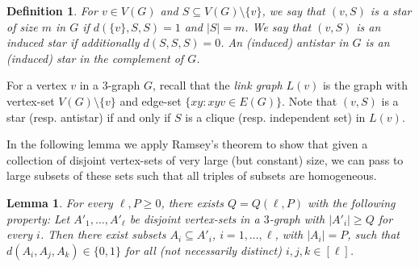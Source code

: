 \documentclass[11pt]{article}
\let\oldendproof\endproof
\renewenvironment{proof}[1][\proofname]{%
	\oldproof[\bf #1]%
}{\oldendproof}
\theoremstyle{plain}
\newtheorem{lemma}[theorem]{Lemma}
\newtheorem{claim}[theorem]{Claim}
\newtheorem{definition}[theorem]{Definition}
\begin{document}
\begin{definition}
    For $v \in V(G)$ and $S \subseteq V(G) \setminus \{v\}$, we say that $(v,S)$ is a {\em star} of size $m$ in $G$ if $d(\{v\},S,S)=1$ and $|S| = m$. We say that $(v,S)$ is an {\em induced star} if additionally $d(S,S,S)=0$. An (induced) {\em antistar} in $G$ is an (induced) star in the complement of $G$.
\end{definition}

For a vertex $v$ in a $3$-graph $G$, recall that the {\em link graph} $L(v)$ is the graph with vertex-set $V(G)\setminus\{v\}$ and edge-set $\{xy : xyv \in E(G)\}$.
Note that $(v,S)$ is a star (resp. antistar) if and only if $S$ is a clique (resp. independent set) in $L(v)$. 

In the following lemma we apply Ramsey's theorem to show that given a collection of disjoint vertex-sets of very large (but constant) size, we can pass to large subsets of these sets such that all triples of subsets are homogeneous. 



\begin{lemma} \label{0-1-densities}
    For every $\ell, P \geq 0$, there exists $Q=Q(\ell,P)$ with the following property: Let $A'_1, \dots, A'_{\ell}$ be disjoint vertex-sets in a $3$-graph with $|A'_i| \geq Q$ for every $i$. Then there exist subsets $A_i \subseteq A'_i$, $i=1,\dots,\ell$, with $|A_i|=P$, such that $d(A_i,A_j,A_k) \in \{0,1\}$ for all (not necessarily distinct) $i,j,k \in [\ell]$.
\end{lemma}
    
        
\end{document}
